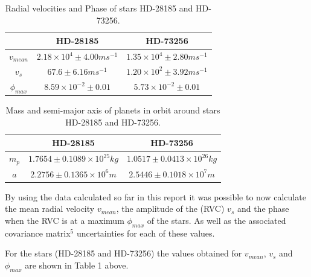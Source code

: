 \documentclass[]{article}
\begin{document}
\begin{table}[t]
  \begin{center}
    \caption{Radial velocities and Phase of stars HD-28185 and HD-73256.}
    \label{tab:table1}
    \begin{tabular}{c|c|c}
       & {HD-28185} & {HD-73256} \\
      \hline
      $v_{mean} $ & $ 2.18\times10^4 \pm4.00ms^{-1}$ & $1.35\times10^4\pm2.80ms^{-1}$ \\
      \hline
      $v_{s}$ & $67.6\pm6.16ms^{-1} $ & $1.20\times10^2\pm3.92ms^{-1}$\\
      \hline
      $\phi_{max}$ & $8.59\times10^{-2} \pm 0.01$ & $5.73\times10^{-2}\pm0.01$  \\
      
    \end{tabular}
  \end{center}
\end{table}
\begin{table}[t]
  \begin{center}
    \caption{Mass and semi-major axis of planets in orbit around stars HD-28185 and HD-73256.}
    \label{tab:table2}
    \begin{tabular}{c|c|c}
       & {HD-28185} & {HD-73256} \\
      \hline
      $m_p$ & $1.7654\pm0.1089\times10^{25}kg$ & $1.0517\pm0.0413\times10^{26}kg$ \\
      \hline
      $a$ & $2.2756\pm0.1365\times10^{6}m$ & $2.5446\pm0.1018\times10^{7}m$\\
      
    \end{tabular}
  \end{center}
\end{table}


By using the data calculated so far in this report it was possible to now calculate 
the mean radial velocity $v_{mean} $, the amplitude of the (RVC)
 $v_{s}$ and the 
phase when the RVC is at a maximum $\phi_{max}$ of the stars.
As well as the associated covariance matrix$^5$ uncertainties for each of these values.
\par
For the stars (HD-28185 and HD-73256) the values obtained for $v_{mean}$, $v_{s}$ 
and $\phi_{max}$ are shown in Table 1 above.
\end{document}
